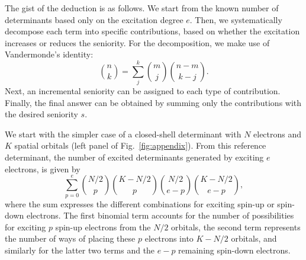 \documentclass[aip,jcp,reprint,noshowkeys,superscriptaddress]{revtex4-1}
\begin{document}
The gist of the deduction is as follows.
We start from the known number of determinants based only on the excitation degree $e$.
Then, we systematically decompose each term into specific contributions,
based on whether the excitation increases or reduces the seniority.
For the decomposition, we make use of Vandermonde's identity:
\begin{equation}
	\binom{n}{k} = \sum_{j}^{k} \binom{m}{j} \binom{n-m}{k-j}.
\end{equation}
Next, an incremental seniority can be assigned to each type of contribution.
Finally, the final answer can be obtained by summing only the contributions with the desired seniority $s$.

We start with the simpler case of a closed-shell determinant with $N$ electrons and $K$ spatial orbitals (left panel of Fig.~\ref{fig:appendix}).
From this reference determinant, the number of excited determinants generated by exciting $e$ electrons, is given by \cite{SzaboBook}
\begin{equation}
	\sum_{p=0}^{e} \binom{N/2}{p} \binom{K-N/2}{p} \binom{N/2}{e-p} \binom{K-N/2}{e-p},
\label{eq:e_closed}
\end{equation}
where the sum expresses the different combinations for exciting spin-up or spin-down electrons.
The first binomial term accounts for the number of possibilities for exciting $p$ spin-up electrons from the $N/2$ orbitals,
the second term represents the number of ways of placing these $p$ electrons into $K-N/2$ orbitals,
and similarly for the latter two terms and the $e-p$ remaining spin-down electrons.
\end{document}
